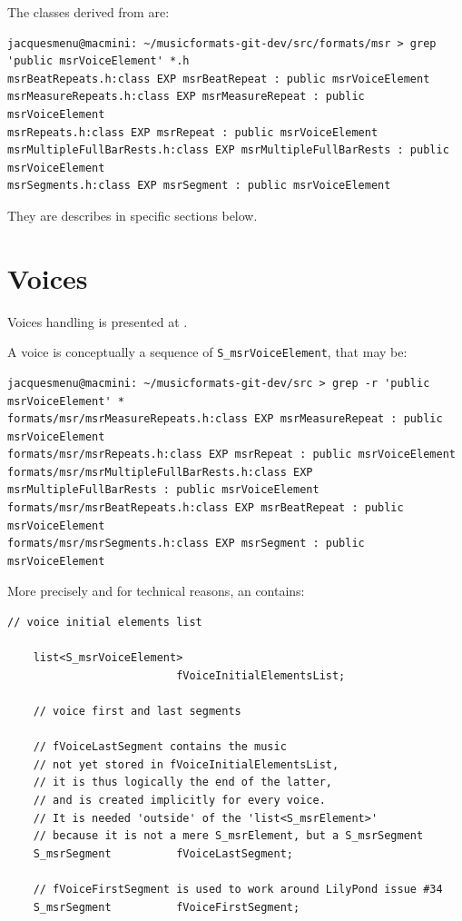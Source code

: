 The classes derived from  are:
\begin{lstlisting}[language=Terminal]
jacquesmenu@macmini: ~/musicformats-git-dev/src/formats/msr > grep 'public msrVoiceElement' *.h
msrBeatRepeats.h:class EXP msrBeatRepeat : public msrVoiceElement
msrMeasureRepeats.h:class EXP msrMeasureRepeat : public msrVoiceElement
msrRepeats.h:class EXP msrRepeat : public msrVoiceElement
msrMultipleFullBarRests.h:class EXP msrMultipleFullBarRests : public msrVoiceElement
msrSegments.h:class EXP msrSegment : public msrVoiceElement
\end{lstlisting}

They are describes in specific sections below.


\section{Voices}\label{Voices}

Voices handling is presented at .

A voice is conceptually a sequence of {\tt S_msrVoiceElement}, that may be:
\begin{lstlisting}[language=Terminal]
jacquesmenu@macmini: ~/musicformats-git-dev/src > grep -r 'public msrVoiceElement' *
formats/msr/msrMeasureRepeats.h:class EXP msrMeasureRepeat : public msrVoiceElement
formats/msr/msrRepeats.h:class EXP msrRepeat : public msrVoiceElement
formats/msr/msrMultipleFullBarRests.h:class EXP msrMultipleFullBarRests : public msrVoiceElement
formats/msr/msrBeatRepeats.h:class EXP msrBeatRepeat : public msrVoiceElement
formats/msr/msrSegments.h:class EXP msrSegment : public msrVoiceElement
\end{lstlisting}

More precisely and for technical reasons, an  contains:
\begin{lstlisting}[language=CPlusPlus]
    // voice initial elements list

    list<S_msrVoiceElement>
                          fVoiceInitialElementsList;

    // voice first and last segments

    // fVoiceLastSegment contains the music
    // not yet stored in fVoiceInitialElementsList,
    // it is thus logically the end of the latter,
    // and is created implicitly for every voice.
    // It is needed 'outside' of the 'list<S_msrElement>'
    // because it is not a mere S_msrElement, but a S_msrSegment
    S_msrSegment          fVoiceLastSegment;

    // fVoiceFirstSegment is used to work around LilyPond issue #34
    S_msrSegment          fVoiceFirstSegment;
\end{lstlisting}


